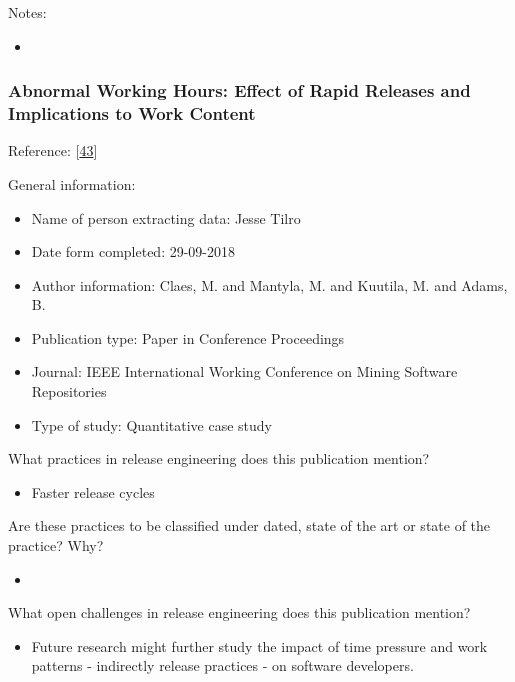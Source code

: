 \documentclass[]{book}
\providecommand{\tightlist}{%
  \setlength{\itemsep}{0pt}\setlength{\parskip}{0pt}}
\begin{document}
Notes:

\begin{itemize}
\item
\end{itemize}

\subsubsection{Abnormal Working Hours: Effect of Rapid Releases and
Implications to Work
Content}\label{abnormal-working-hours-effect-of-rapid-releases-and-implications-to-work-content}

Reference: {[}\protect\hyperlink{ref-claes2017a}{43}{]}

General information:

\begin{itemize}
\tightlist
\item
  Name of person extracting data: Jesse Tilro
\item
  Date form completed: 29-09-2018
\item
  Author information: Claes, M. and Mantyla, M. and Kuutila, M. and
  Adams, B.
\item
  Publication type: Paper in Conference Proceedings
\item
  Journal: IEEE International Working Conference on Mining Software
  Repositories
\item
  Type of study: Quantitative case study
\end{itemize}

What practices in release engineering does this publication mention?

\begin{itemize}
\tightlist
\item
  Faster release cycles
\end{itemize}

Are these practices to be classified under dated, state of the art or
state of the practice? Why?

\begin{itemize}
\item
\end{itemize}

What open challenges in release engineering does this publication
mention?

\begin{itemize}
\tightlist
\item
  Future research might further study the impact of time pressure and
  work patterns - indirectly release practices - on software developers.
\end{itemize}
\end{document}
